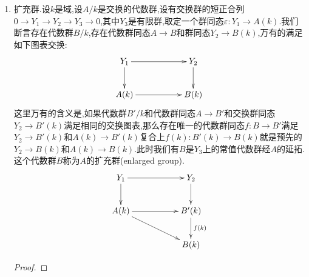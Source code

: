 \begin{enumerate}
	\item 扩充群.设$k$是域,设$A/k$是交换的代数群,设有交换群的短正合列$0\to Y_1\to Y_2\to Y_3\to0$,其中$Y_3$是有限群,取定一个群同态$\varepsilon:Y_1\to A(k)$.我们断言存在代数群$B/k$,存在代数群同态$A\to B$和群同态$Y_2\to B(k)$,万有的满足如下图表交换:
	$$\xymatrix{Y_1\ar[rr]\ar[d]&&Y_2\ar[d]\\A(k)\ar[rr]&&B(k)}$$
	这里万有的含义是,如果代数群$B'/k$和代数群同态$A\to B'$和交换群同态$Y_2\to B'(k)$满足相同的交换图表,那么存在唯一的代数群同态$f:B\to B'$满足$Y_2\to B'(k)$和$A(k)\to B'(k)$复合上$f(k):B'(k)\to B(k)$就是预先的$Y_2\to B(k)$和$A(k)\to B(k)$.此时我们有$B$是$Y_3$上的常值代数群经$A$的延拓.这个代数群$B$称为$A$的扩充群(enlarged group).
	$$\xymatrix{Y_1\ar[rr]\ar[d]&&Y_2\ar[d]\\A(k)\ar[rr]\ar[drr]&&B'(k)\ar[d]^{f(k)}\\&&B(k)}$$
	\begin{proof}
		

\end{proof}
\end{enumerate}
